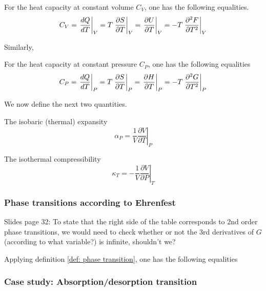 \documentclass[../phys-f308.tex]{subfiles}
\begin{document}
    \begin{property} For the heat capacity at constant volume $C_V$, one has the following equalities.
        \begin{equation}
            C_V = \left.\frac{dQ}{dT}\right|_V = T\left.\frac{\partial S}{\partial T}\right|_{V} = \left.\frac{\partial U}{\partial T}\right|_{V} = -T\left.\frac{\partial^2F}{\partial T^2}\right|_V
        \end{equation}
    \end{property}
    Similarly,
    \begin{property}
        For the heat capacity at constant pressure $C_P$, one has the following equalities
        \begin{equation}
            C_P = \left.\frac{dQ}{dT}\right|_P = T\left.\frac{\partial S}{\partial T}\right|_{P} = \left.\frac{\partial H}{\partial T}\right|_{P} = -T\left.\frac{\partial^2G}{\partial T^2}\right|_P
        \end{equation}
    \end{property}

    We now define the next two quantities.
    \begin{definition}
        The isobaric (thermal) expansity
        \begin{equation}
            \alpha_P = \frac{1}{V}\left.\frac{\partial V}{\partial T}\right|_P
        \end{equation}
    \end{definition}
    \begin{definition}
        The isothermal compressibility
        \begin{equation}
            \kappa_T = -\frac{1}{V}\left.\frac{\partial V}{\partial P}\right|_T
        \end{equation}
    \end{definition}

    \subsubsection{Phase transitions according to Ehrenfest}

    \color{red} Slides page 32: To state that the right side of the table corresponds to 2nd order phase transitions, we would need to check whether or not the 3rd derivatives of $G$ (according to what variable?) is infinite, shouldn't we?\color{black}

    Applying definition \ref{def: phase transition}, one has the following equalities



    \subsubsection{Case study: Absorption/desorption transition}
\end{document}
